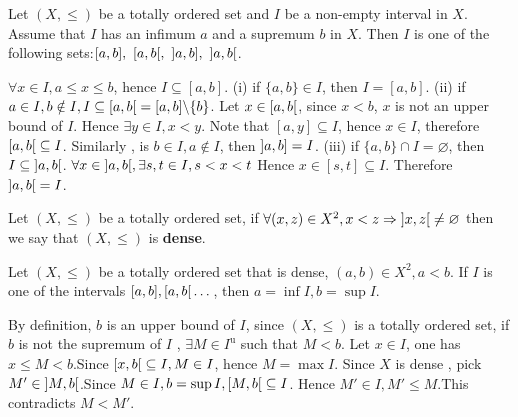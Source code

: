 \begin{propositionenv}
   Let $(X, \le )$ be a totally ordered set and $I $ be a  non-empty interval in $X$. Assume that $I$ has an infimum $a$ and a supremum $b$ in $X$. Then $I$ is one of the following sets:$[a, b], \ \interval[open right]{a}{b}, \ \interval[open left]{a}{b}, \ \interval[open]{a}{b}$.
\end{propositionenv}
\begin{proofenv}
    $\forall x\in I , a\le x\le b $, hence $I\subseteq [a, b]$.
    \newline
    (i) if $\{a, b\}\in I$,  then $I=[a, b]$.
    \newline
    (ii) if $a\in I,  b\notin I, I\subseteq\interval[open right]{a}{b}=[a, b]\backslash\{b\}$. Let $x\in \interval[open right]{a}{b}$,  since $x<b$,  $x$ is not an upper bound of $I$. Hence $\exists y\in I,  x<y$. Note that $[a, y]\subseteq I$,  hence $x\in I$,  therefore $\interval[open right]{a}{b}\subseteq I$. Similarly ,  is $b\in I, a\notin I$,  then $\interval[open left]{a}{b}=I$.
    \newline
    (iii) if $\{a, b\}\cap I=\varnothing$,  then $I\subseteq\interval[open]{a}{b}$. $\forall x\in \interval[open]{a}{b}, \exists s, t\in I, s<x<t$ Hence $x\in [s, t]\subseteq I$. Therefore $\interval[open]{a}{b}=I$.

\end{proofenv}
\begin{definitionenv}[Dense]
    Let $(X, \le )$ be a totally ordered set,  if $\forall (x, z)\in X^2, x<z\Rightarrow \interval[open]{x}{z}\not=\varnothing$ then we say that $(X, \le)$ is \textbf{dense}.
\end{definitionenv}
\begin{propositionenv}
    Let $(X, \le )$ be a totally ordered set that is dense,  $(a, b)\in X^2, a<b$. If $I$ is one of the intervals $[a, b], \interval[open right]{a}{b}\dots$,  then $a=\inf I, b=\sup I$.
\end{propositionenv}
\begin{proofenv}
    By definition,  $b$ is an upper bound of $I$,  since $(X, \le)$ is a totally ordered set, if $b$ is not the supremum of $I$ ,  $\exists M\in I^\mathrm{u}$ such that $M<b$.
    Let $x\in I$, one has $x\le M <b$.Since $\interval[open right]{x}{b}\subseteq I, M\in I$,  hence $M=\max I$. Since $X$ is dense , pick $M'\in \interval[open]{M}{b}$.Since $M\in I, b=\sup I, \interval[open right]{M}{b}\subseteq I$. Hence $M'\in I, M'\le M$.This contradicts $M<M'$.
\end{proofenv}


